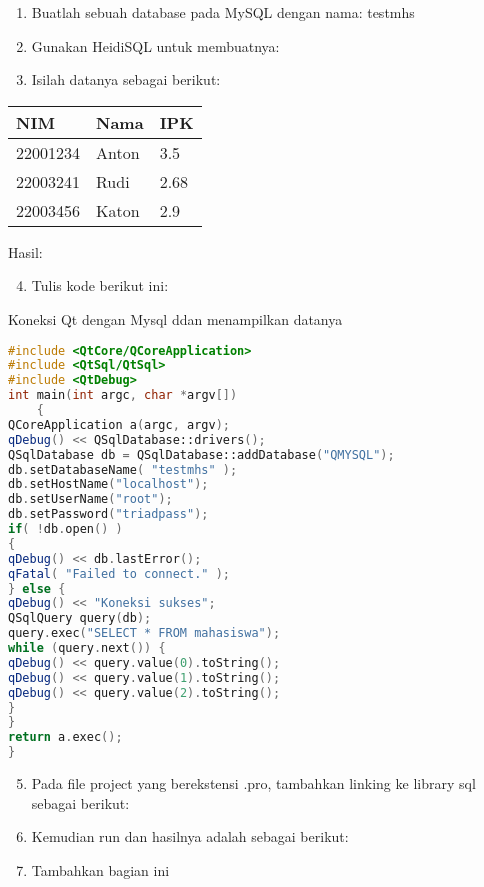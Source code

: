 \begin{enumerate}


\item
  Buatlah sebuah database pada MySQL dengan nama: testmhs
\item
  Gunakan HeidiSQL untuk membuatnya:
\item
  Isilah datanya sebagai berikut:
\end{enumerate}

\begin{longtable}[]{@{}lll@{}}
\toprule
NIM & Nama & IPK\tabularnewline
\midrule
\endhead
22001234 & Anton & 3.5\tabularnewline
22003241 & Rudi & 2.68\tabularnewline
22003456 & Katon & 2.9\tabularnewline
\bottomrule
\end{longtable}

Hasil:

\begin{enumerate}

\setcounter{enumi}{3}

\item
  Tulis kode berikut ini:
\end{enumerate}

Koneksi Qt dengan Mysql ddan menampilkan datanya

\begin{lstlisting}[language=c++, caption=Percobaan koneksi MySQL dengan QtConsole]
#include <QtCore/QCoreApplication>
#include <QtSql/QtSql>
#include <QtDebug>
int main(int argc, char *argv[])
    {
QCoreApplication a(argc, argv);
qDebug() << QSqlDatabase::drivers();
QSqlDatabase db = QSqlDatabase::addDatabase("QMYSQL");
db.setDatabaseName( "testmhs" );
db.setHostName("localhost");
db.setUserName("root");
db.setPassword("triadpass");
if( !db.open() )
{
qDebug() << db.lastError();
qFatal( "Failed to connect." );
} else {
qDebug() << "Koneksi sukses";
QSqlQuery query(db);
query.exec("SELECT * FROM mahasiswa");
while (query.next()) {
qDebug() << query.value(0).toString();
qDebug() << query.value(1).toString();
qDebug() << query.value(2).toString();
}
}
return a.exec();
}
\end{lstlisting}

\begin{enumerate}

\setcounter{enumi}{4}
\item
  Pada file project yang berekstensi .pro, tambahkan linking ke library
  sql sebagai berikut:
\item
  Kemudian run dan hasilnya adalah sebagai berikut:
\item
  Tambahkan bagian ini
\end{enumerate}

